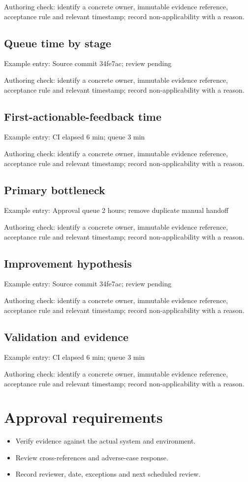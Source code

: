 \documentclass[10pt,letterpaper]{article}
\begin{document}
Authoring check: identify a concrete owner, immutable evidence reference, acceptance rule and relevant timestamp; record non-applicability with a reason.


\subsection{Queue time by stage}
Example entry: Source commit 34fe7ac; review pending

Authoring check: identify a concrete owner, immutable evidence reference, acceptance rule and relevant timestamp; record non-applicability with a reason.


\subsection{First-actionable-feedback time}
Example entry: CI elapsed 6 min; queue 3 min

Authoring check: identify a concrete owner, immutable evidence reference, acceptance rule and relevant timestamp; record non-applicability with a reason.


\subsection{Primary bottleneck}
Example entry: Approval queue 2 hours; remove duplicate manual handoff

Authoring check: identify a concrete owner, immutable evidence reference, acceptance rule and relevant timestamp; record non-applicability with a reason.


\subsection{Improvement hypothesis}
Example entry: Source commit 34fe7ac; review pending

Authoring check: identify a concrete owner, immutable evidence reference, acceptance rule and relevant timestamp; record non-applicability with a reason.


\subsection{Validation and evidence}
Example entry: CI elapsed 6 min; queue 3 min

Authoring check: identify a concrete owner, immutable evidence reference, acceptance rule and relevant timestamp; record non-applicability with a reason.


\section{Approval requirements}
\begin{itemize}
\item Verify evidence against the actual system and environment.
\item Review cross-references and adverse-case response.
\item Record reviewer, date, exceptions and next scheduled review.
\end{itemize}
\end{document}
